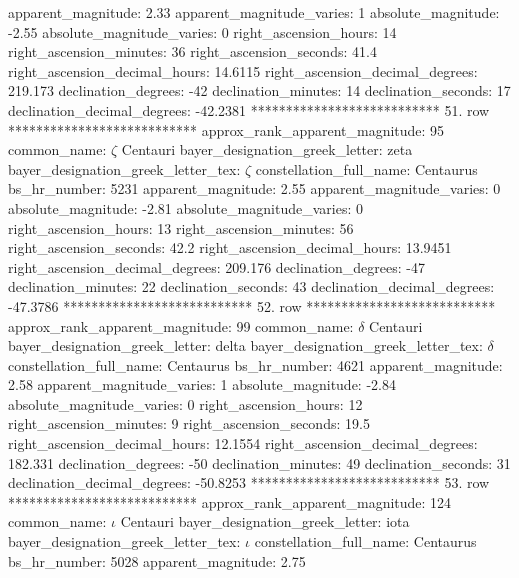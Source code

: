                 apparent_magnitude: 2.33
         apparent_magnitude_varies: 1
                absolute_magnitude: -2.55
         absolute_magnitude_varies: 0
             right_ascension_hours: 14
           right_ascension_minutes: 36
           right_ascension_seconds: 41.4
     right_ascension_decimal_hours: 14.6115
   right_ascension_decimal_degrees: 219.173
               declination_degrees: -42
               declination_minutes: 14
               declination_seconds: 17
       declination_decimal_degrees: -42.2381
*************************** 51. row ***************************
    approx_rank_apparent_magnitude: 95
                       common_name: $\zeta$ Centauri
    bayer_designation_greek_letter: zeta
bayer_designation_greek_letter_tex: $\zeta$
           constellation_full_name: Centaurus
                      bs_hr_number: 5231
                apparent_magnitude: 2.55
         apparent_magnitude_varies: 0
                absolute_magnitude: -2.81
         absolute_magnitude_varies: 0
             right_ascension_hours: 13
           right_ascension_minutes: 56
           right_ascension_seconds: 42.2
     right_ascension_decimal_hours: 13.9451
   right_ascension_decimal_degrees: 209.176
               declination_degrees: -47
               declination_minutes: 22
               declination_seconds: 43
       declination_decimal_degrees: -47.3786
*************************** 52. row ***************************
    approx_rank_apparent_magnitude: 99
                       common_name: $\delta$ Centauri
    bayer_designation_greek_letter: delta
bayer_designation_greek_letter_tex: $\delta$
           constellation_full_name: Centaurus
                      bs_hr_number: 4621
                apparent_magnitude: 2.58
         apparent_magnitude_varies: 1
                absolute_magnitude: -2.84
         absolute_magnitude_varies: 0
             right_ascension_hours: 12
           right_ascension_minutes: 9
           right_ascension_seconds: 19.5
     right_ascension_decimal_hours: 12.1554
   right_ascension_decimal_degrees: 182.331
               declination_degrees: -50
               declination_minutes: 49
               declination_seconds: 31
       declination_decimal_degrees: -50.8253
*************************** 53. row ***************************
    approx_rank_apparent_magnitude: 124
                       common_name: $\iota$ Centauri
    bayer_designation_greek_letter: iota
bayer_designation_greek_letter_tex: $\iota$
           constellation_full_name: Centaurus
                      bs_hr_number: 5028
                apparent_magnitude: 2.75
